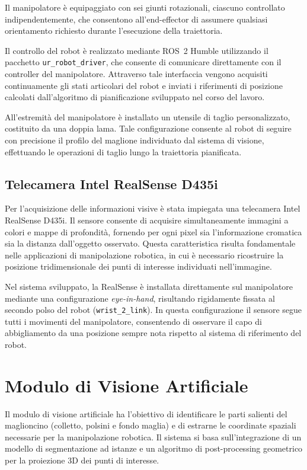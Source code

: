 \documentclass[11pt]{report}
\begin{document}
Il manipolatore è equipaggiato con sei giunti rotazionali, ciascuno controllato indipendentemente, che consentono all'end-effector di assumere qualsiasi orientamento richiesto durante l'esecuzione della traiettoria.

Il controllo del robot è realizzato mediante ROS~2 Humble utilizzando il pacchetto \texttt{ur\_robot\_driver}, che consente di comunicare direttamente con il controller del manipolatore. Attraverso tale interfaccia vengono acquisiti continuamente gli stati articolari del robot e inviati i riferimenti di posizione calcolati dall'algoritmo di pianificazione sviluppato nel corso del lavoro.

All'estremità del manipolatore è installato un utensile di taglio personalizzato, costituito da una doppia lama. Tale configurazione consente al robot di seguire con precisione il profilo del maglione individuato dal sistema di visione, effettuando le operazioni di taglio lungo la traiettoria pianificata.

\section{Telecamera Intel RealSense D435i}

Per l'acquisizione delle informazioni visive è stata impiegata una telecamera Intel RealSense D435i. Il sensore consente di acquisire simultaneamente immagini a colori e mappe di profondità, fornendo per ogni pixel sia l'informazione cromatica sia la distanza dall'oggetto osservato. Questa caratteristica risulta fondamentale nelle applicazioni di manipolazione robotica, in cui è necessario ricostruire la posizione tridimensionale dei punti di interesse individuati nell'immagine.

Nel sistema sviluppato, la RealSense è installata direttamente sul manipolatore mediante una configurazione \textit{eye-in-hand}, risultando rigidamente fissata al secondo polso del robot (\texttt{wrist\_2\_link}). In questa configurazione il sensore segue tutti i movimenti del manipolatore, consentendo di osservare il capo di abbigliamento da una posizione sempre nota rispetto al sistema di riferimento del robot.

\chapter{Modulo di Visione Artificiale}

Il modulo di visione artificiale ha l'obiettivo di identificare le parti salienti del maglioncino (colletto, polsini e fondo maglia) e di estrarne le coordinate spaziali necessarie per la manipolazione robotica. Il sistema si basa sull'integrazione di un modello di segmentazione ad istanze e un algoritmo di post-processing geometrico per la proiezione 3D dei punti di interesse.
\end{document}
